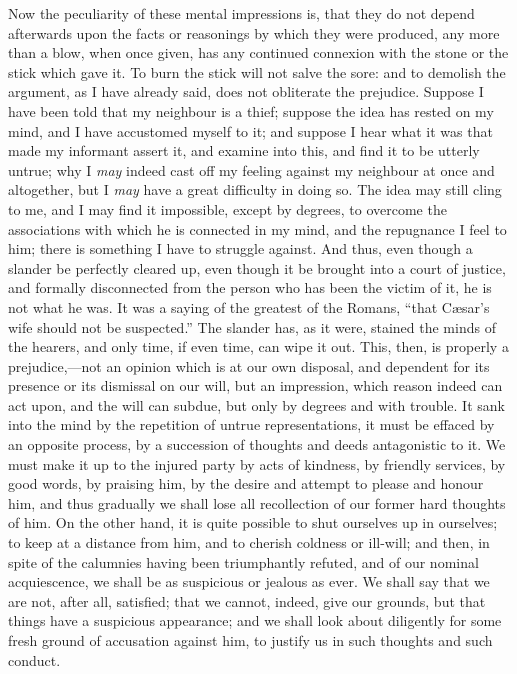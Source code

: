 Now the peculiarity of these mental impressions is,
that they do not depend afterwards upon the facts or
reasonings by which they were produced, any more than a
blow, when once given, has any continued connexion with
the stone or the stick which gave it. To burn the stick
will not salve the sore: and to demolish the argument, as
I have already said, does not obliterate the prejudice.
Suppose I have been told that my neighbour is a thief;
suppose the idea has rested on my mind, and I have
accustomed myself to it; and suppose I hear what it was
that made my informant assert it, and examine into this,
and find it to be utterly untrue; why I \emph{may}
indeed cast off my feeling against my neighbour at once
and altogether, but I \emph{may} have a great
difficulty in doing so. The idea may still cling to me,
and I may find it impossible, except by degrees, to
overcome the associations with which he is connected in
my mind, and the repugnance I feel to him; there is
something I have to struggle against. And thus, even
though a slander be perfectly cleared up, even though it
be brought into a court of justice, and formally
disconnected from the person who has been the victim of
it, he is not what he was. It was a saying of the
greatest of the Romans, ``that Cæsar's wife should
not be suspected.'' The slander has, as it were,
stained the minds of the hearers, and only time, if even
time, can wipe it out. This, then, is properly a
prejudice,—not an opinion which is at our own
disposal, and dependent for its presence or its dismissal
on our will, but an impression, which reason indeed can
act upon, and the will can subdue, but only by degrees
and with trouble. It sank into the mind by the repetition
of untrue representations, it must be effaced by an
opposite process, by a succession of thoughts and deeds
antagonistic to it. We must make it up to the injured
party by acts of kindness, by friendly services, by good
words, by praising him, by the desire and attempt to
please and honour him, and thus gradually we shall lose
all recollection of our former hard thoughts of him. On
the other hand, it is quite possible to shut ourselves up
in ourselves; to keep at a distance from him, and to
cherish coldness or ill-will; and then, in spite of the
calumnies having been triumphantly refuted, and of our
nominal acquiescence, we shall be as suspicious or
jealous as ever. We shall say that we are not, after all,
satisfied; that we cannot, indeed, give our grounds, but
that things have a suspicious appearance; and we shall
look about diligently for some fresh ground of accusation
against him, to justify us in such thoughts and such
conduct.

